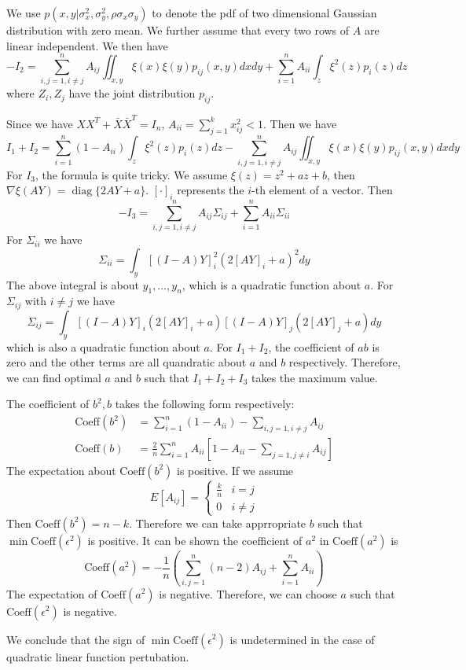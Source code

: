 \documentclass{article}
\DeclareMathOperator*{\diag}{diag}
\begin{document}
We use $p(x,y | \sigma^2_x, \sigma^2_y, \rho \sigma_x \sigma_y)$ to denote the pdf of two dimensional Gaussian distribution with zero mean. 
We further assume that every two rows of $A$ are linear independent.
We then have
\begin{equation*}
-I_2   = \sum_{i,j=1, i \neq j}^n A_{ij} \iint_{x,y} \xi(x)\xi(y) p_{ij}(x,y) dx dy + \sum_{i=1}^n A_{ii} \int_z \xi^2(z) p_i(z) dz 
\end{equation*}
where $Z_i, Z_j$ have the joint distribution $p_{ij}$.

Since we have $XX^T + \bar{X}\bar{X}^T = I_n$, $A_{ii} = \sum_{j=1}^k x^2_{ij} < 1$. Then we have
\begin{equation*}
I_1+ I_2 =   \sum_{i=1}^n (1-A_{ii}) \int_z \xi^2(z) p_i(z) dz  - \sum_{i,j=1, i \neq j}^n A_{ij} \iint_{x,y} \xi(x)\xi(y) p_{ij}(x,y) dx dy
\end{equation*}
For $I_3$, the formula is quite tricky. We assume $\xi(z) = z^2 + a z + b $, then $\nabla \xi (AY) = \diag\{2AY+ a\}$. $[\cdot]_i$ represents the $i$-th element of a vector.
Then
\begin{equation*}
-I_3 = \sum_{i,j=1, i \neq j}^n A_{ij}\Sigma_{ij} + \sum_{i=1}^n A_{ii}\Sigma_{ii}
\end{equation*}
For $\Sigma_{ii}$ we have
\begin{equation*}
\Sigma_{ii} = \int_y [(I - A)Y]^2_i (2[AY]_i + a)^2 dy
\end{equation*}
The above integral is about $y_1, \dots, y_n$, which is a quadratic function about $a$.
For $\Sigma_{ij}$ with $i\neq j$ we have
\begin{equation*}
\Sigma_{ij} = \int_y [(I - A)Y]_i (2[AY]_i + a)[(I - A)Y]_j (2[AY]_j + a) dy
\end{equation*}
which is also a quadratic function about $a$.
For $I_1 + I_2$, the coefficient of $ab$ is zero and the other terms are all quandratic about $a$ and $b$ respectively. Therefore, we can find optimal $a$ and $b$ such that $I_1 + I_2 + I_3$ takes the maximum value.

The coefficient of $b^2, b$ takes the following form respectively:
\begin{align*}
\textrm{Coeff}(b^2) & = \sum_{i=1}^n (1-A_{ii}) - \sum_{i,j=1, i\neq j} A_{ij} \\
\textrm{Coeff}(b) & = \frac{2}{n}\sum_{i=1}^n A_{ii} [ 1 - A_{ii} - \sum_{j=1, j\neq i} A_{ij} ]
\end{align*}
The expectation about $\textrm{Coeff}(b^2)$ is positive. If  we assume
$$
E[A_{ij}]= \begin{cases}
\frac{k}{n} & i = j\\
0 & i\neq j 
\end{cases}
$$
Then $\textrm{Coeff}(b^2)  = n-k$. 
Therefore we can take apprropriate $b$ such that $\min \textrm{Coeff}(\epsilon^2)$ is positive.
It can be shown the coefficient of $a^2$ in $\textrm{Coeff}(a^2)$ is 
\begin{equation}
\textrm{Coeff}(a^2) = -\frac{1}{n}( \sum_{i,j=1}^n (n-2) A_{ij} + \sum_{i=1}^n A_{ii})
\end{equation}
The expectation of $\textrm{Coeff}(a^2)$ is negative. Therefore, we can choose $a$ such that $\textrm{Coeff}(\epsilon^2)$ is negative.

We conclude that the sign of $\min \textrm{Coeff}(\epsilon^2)$ is undetermined in the case of quadratic linear function pertubation.
\end{document}
